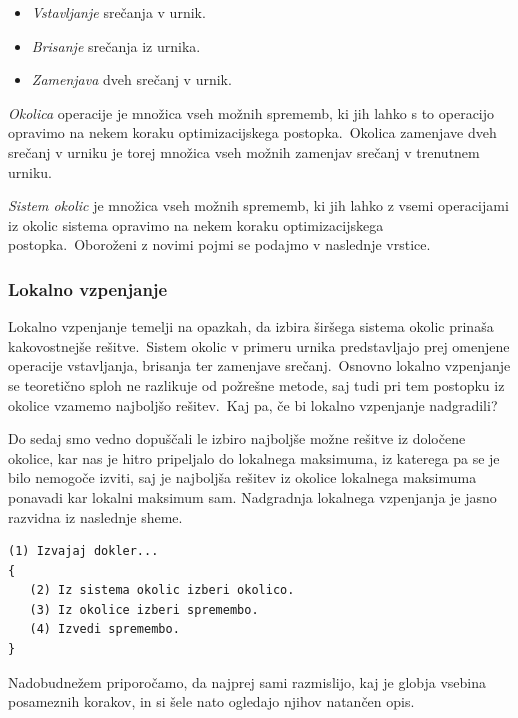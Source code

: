 \documentclass[a4paper,10pt]{article}
\begin{document}
\begin{itemize}
   \item \emph{Vstavljanje} srečanja v urnik.
   \item \emph{Brisanje} srečanja iz urnika.
   \item \emph{Zamenjava} dveh srečanj v urnik.
\end{itemize}

\noindent \emph{Okolica} operacije je množica vseh možnih sprememb, ki jih lahko s to operacijo
opravimo na nekem koraku optimizacijskega postopka.\ Okolica zamenjave dveh srečanj v urniku
je torej množica vseh možnih zamenjav srečanj v trenutnem urniku.

\emph{Sistem okolic} je množica vseh možnih sprememb, ki jih lahko z vsemi operacijami iz
okolic sistema opravimo na nekem koraku optimizacijskega postopka.\ Oboroženi z novimi pojmi
se podajmo v naslednje vrstice.

\subsubsection{Lokalno vzpenjanje}

Lokalno vzpenjanje temelji na opazkah, da izbira širšega sistema okolic prinaša kakovostnejše
rešitve.\ Sistem okolic v primeru urnika predstavljajo prej omenjene operacije vstavljanja,
brisanja ter zamenjave srečanj.\ Osnovno lokalno vzpenjanje se teoretično sploh ne razlikuje
od požrešne metode, saj tudi pri tem postopku iz okolice vzamemo najboljšo rešitev.\ Kaj pa,
če bi lokalno vzpenjanje nadgradili?

Do sedaj smo vedno dopuščali le izbiro najboljše možne rešitve iz določene okolice, kar nas
je hitro pripeljalo do lokalnega maksimuma, iz katerega pa se je bilo nemogoče izviti, saj
je najboljša rešitev iz okolice lokalnega maksimuma ponavadi kar lokalni maksimum sam.
Nadgradnja lokalnega vzpenjanja je jasno razvidna iz naslednje sheme.

\begin{verbatim}
(1) Izvajaj dokler...
{
   (2) Iz sistema okolic izberi okolico.
   (3) Iz okolice izberi spremembo.
   (4) Izvedi spremembo.
}
\end{verbatim}

\noindent Nadobudnežem priporočamo, da najprej sami razmislijo, kaj je globja vsebina posameznih
korakov, in si šele nato ogledajo njihov natančen opis.
\end{document}
